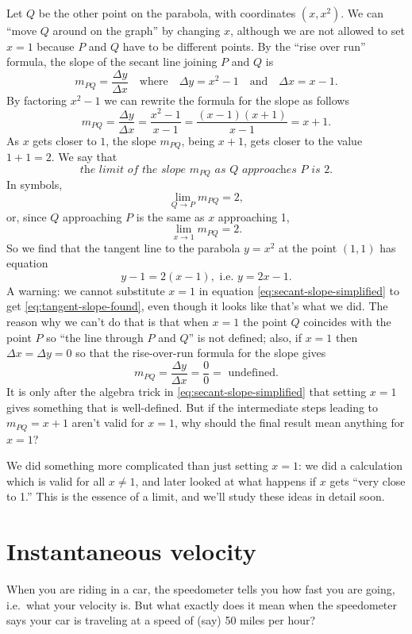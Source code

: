 Let $Q$ be the other point on the parabola, with coordinates $(x, x^2)$.  We can ``move
$Q$ around on the graph'' by changing $x$, although we are not allowed to set
$x=1$ because $P$ and $Q$ have to be different points.  By the ``rise over run''
formula, the slope of the secant line joining $P$ and $Q$ is
\[
  m_{PQ}= \frac{\Delta y}{\Delta x}
  \quad\text{where}\quad
  \Delta y=x^2-1
  \quad\text{and}\quad
  \Delta x = x-1.
\]
By factoring $x^2-1$ we can rewrite the formula for the slope as follows
\begin{equation}\label{eq:secant-slope-simplified}
  m_{PQ}= \frac{\Delta y}{\Delta x}
  =\frac{x^2-1}{x-1}
  =\frac{(x-1)(x+1)}{x-1}
  = x+1.
\end{equation}
As $x$ gets closer to $1$, the slope $m_{PQ}$, being $x+1$, gets closer to the
value $1+1= 2$.  We say that
\begin{equation*}
  \textit{the limit of the slope $m_{PQ}$ as $Q$ approaches $P$ is $2$.}
\end{equation*}
In symbols,
\[
\lim_{Q\to P} m_{PQ} = 2,
\]
or, since $Q$ approaching $P$ is the same as $x$ approaching 1,
\begin{equation}\label{eq:tangent-slope-found}
  \lim_{x\to 1} m_{PQ} = 2.
\end{equation}
So we find that the tangent line to the parabola $y=x^2$ at the point $(1,1)$ has equation
\[
y-1 = 2 (x-1), \text{~i.e.~} y=2x-1.
\]
A warning: we cannot substitute $x=1$ in equation
\eqref{eq:secant-slope-simplified} to get \eqref{eq:tangent-slope-found}, even
though it looks like that's what we did.  The reason why we can't do that is
that when $x=1$ the point $Q$ coincides with the point $P$ so ``the line through
$P$ and $Q$'' is not defined; also, if $x=1$ then $\Delta x=\Delta y =0$ so that
the rise-over-run formula for the slope gives
\[
m_{PQ} = \frac{\Delta y}{\Delta x} = \frac 00 = \text{~undefined.}
\]
It is only after the algebra trick in \eqref{eq:secant-slope-simplified} that
setting $x=1$ gives something that is well-defined.  But if the intermediate
steps leading to $m_{PQ}=x+1$ aren't valid for $x=1$, why should the final
result mean anything for $x=1$?

We did something more complicated than just setting $x=1$: we did a calculation
which is valid for all $x\neq 1$, and later looked at what happens if $x$ gets
``very close to 1.''  This is the essence of a limit, and we'll study these
ideas in detail soon.


\section{Instantaneous velocity} 
When you are riding in a car, the speedometer tells you how fast you are going,
i.e.\ what your velocity is.  But what exactly does it mean when the speedometer
says your car is traveling at a speed of (say) 50 miles per hour?

